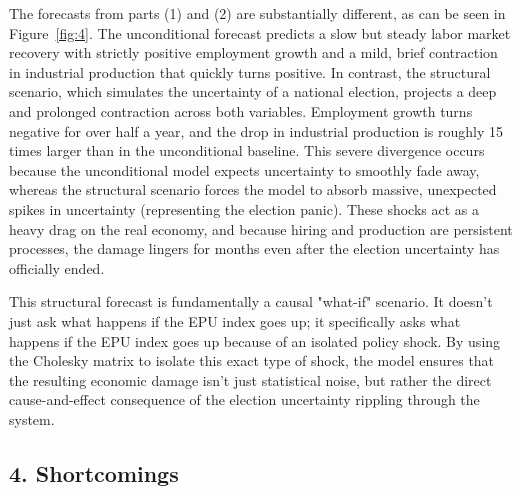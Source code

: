 \documentclass[11pt]{article}
\begin{document}
The forecasts from parts (1) and (2) are substantially different, as can be seen in Figure~\ref{fig:4}. The unconditional forecast predicts 
a slow but steady labor market recovery with strictly positive employment growth and a mild, brief contraction in industrial production that 
quickly turns positive. In contrast, the structural scenario, which simulates the uncertainty of a national election, projects a deep and 
prolonged contraction across both variables. Employment growth turns negative for over half a year, and the drop in industrial production 
is roughly 15 times larger than in the unconditional baseline. This severe divergence occurs because the unconditional model expects 
uncertainty to smoothly fade away, whereas the structural scenario forces the model to absorb massive, unexpected spikes in uncertainty 
(representing the election panic). These shocks act as a heavy drag on the real economy, and because hiring and production are persistent 
processes, the damage lingers for months even after the election uncertainty has officially ended.

This structural forecast is fundamentally a causal "what-if" scenario. It doesn't just ask what happens if the EPU index goes up; it 
specifically asks what happens if the EPU index goes up because of an isolated policy shock. By using the Cholesky matrix to isolate this 
exact type of shock, the model ensures that the resulting economic damage isn't just statistical noise, but rather the direct cause-and-effect 
consequence of the election uncertainty rippling through the system.

\subsection*{4. Shortcomings}
\end{document}
